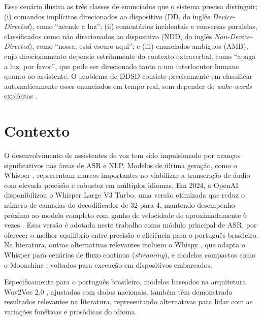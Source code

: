 \documentclass[
    12pt,                %
    openright,           %
    oneside,             %
    a4paper,             %
    english,             %
    brazil               %
]{abntex2}
\begin{document}
Esse cenário ilustra as três classes de enunciados que o sistema precisa distinguir: (i) comandos implícitos direcionados ao dispositivo (DD, do inglês \textit{Device-Directed}), como ``acende a luz''; (ii) comentários incidentais e conversas paralelas, classificados como não direcionados ao dispositivo (NDD, do inglês \textit{Non-Device-Directed}), como ``nossa, está escuro aqui''; e (iii) enunciados ambíguos (AMB), cujo direcionamento depende estritamente do contexto extraverbal, como ``apaga a luz, por favor'', que pode ser direcionado tanto a um interlocutor humano quanto ao assistente. O problema de DDSD consiste precisamente em classificar automaticamente esses enunciados em tempo real, sem depender de \textit{wake-words} explícitas \cite{Mallidi2018, Wagner2024}.

\section{Contexto}
\label{sec:contexto}

O desenvolvimento de assistentes de voz tem sido impulsionado por avanços significativos nas áreas de ASR e NLP. Modelos de última geração, como o Whisper \cite{Radford2023}, representam marcos importantes ao viabilizar a transcrição de áudio com elevada precisão e robustez em múltiplos idiomas. Em 2024, a OpenAI disponibilizou o Whisper Large V3 Turbo, uma versão otimizada que reduz o número de camadas do decodificador de 32 para 4, mantendo desempenho próximo ao modelo completo com ganho de velocidade de aproximadamente 6 vezes \cite{Jeffries2024, Bevilacqua2024}. Essa versão é adotada neste trabalho como módulo principal de ASR, por oferecer o melhor equilíbrio entre precisão e eficiência para o português brasileiro. Na literatura, outras alternativas relevantes incluem o Whispy \cite{Bevilacqua2024}, que adapta o Whisper para cenários de fluxo contínuo (\textit{streaming}), e modelos compactos como o Moonshine \cite{Jeffries2024}, voltados para execução em dispositivos embarcados.

Especificamente para o português brasileiro, modelos baseados na arquitetura Wav2Vec 2.0 \cite{Grosman2021}, ajustados com dados nacionais, também têm demonstrado resultados relevantes na literatura, representando alternativas para lidar com as variações fonéticas e prosódicas do idioma.
\end{document}
